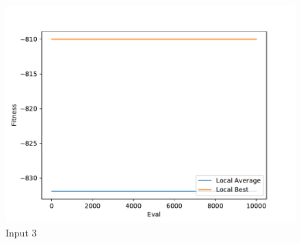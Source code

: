 \documentclass{standalone}
\begin{document}
\begin{figure}[!htb]
	\caption{Input 3}
	\label{fig:graph_3049}
	\includegraphics[width=\textwidth]{../graphs/graphs/3049.pdf}
\end{figure}
\end{document}
